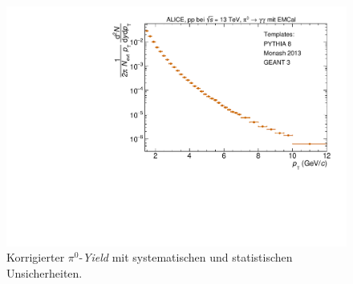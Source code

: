 \begin{figure}[t!]
\centering
\includegraphics[width=.65\linewidth]{KorrigierterYield_Data_2016.pdf}
\caption{Korrigierter $\pi^{0}$-\textit{Yield} mit systematischen und statistischen Unsicherheiten.}
\label{fig:KorrYield}
\end{figure}
\newline
